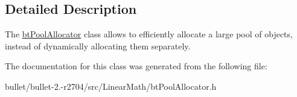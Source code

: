 \subsection{Detailed Description}
The \hyperlink{classbt_pool_allocator}{bt\+Pool\+Allocator} class allows to efficiently allocate a large pool of objects, instead of dynamically allocating them separately. 

The documentation for this class was generated from the following file\+:\begin{DoxyCompactItemize}
\item 
bullet/bullet-\/2.-\/r2704/src/\+Linear\+Math/bt\+Pool\+Allocator.\+h\end{DoxyCompactItemize}
